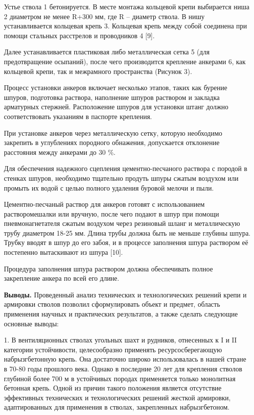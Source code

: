 \begin{multicols}{2}
Устье ствола 1 бетонируется. В месте монтажа кольцевой крепи выбирается
ниша 2 диаметром не менее R+300 мм, где R -- диаметр ствола. В нишу
устанавливается кольцевая крепь 3. Кольцевая крепь между собой соединена
при помощи стальных расстрелов и проводников 4 {[}9{]}.

Далее устанавливается пластиковая либо металлическая сетка 5 (для
предотвращение осыпаний), после чего производится крепление анкерами 6,
как кольцевой крепи, так и межрамного пространства (Рисунок 3).

Процесс установки анкеров включает несколько этапов, таких как бурение
шпуров, подготовка раствора, наполнение шпуров раствором и закладка
арматурных стержней. Расположение шпуров для установки штанг должно
соответствовать указаниям в паспорте крепления.

При установке анкеров через металлическую сетку, которую необходимо
закрепить в углублениях породного обнажения, допускается отклонение
расстояния между анкерами до 30 \%.

Для обеспечения надежного сцепления цементно-песчаного раствора с
породой в стенках шпуров, необходимо тщательно продуть шпуры сжатым
воздухом или промыть их водой с целью полного удаления буровой мелочи и
пыли.

Цементно-песчаный раствор для анкеров готовят с использованием
растворомешалки или вручную, после чего подают в шпур при помощи
пневмонагнетателя сжатым воздухом через резиновый шланг и металлическую
трубу диаметром 18-25 мм. Длина трубы должна быть не меньше глубины
шпура. Трубку вводят в шпур до его забоя, и в процессе заполнения шпура
раствором её постепенно вытаскивают из шпура {[}10{]}.

Процедура заполнения шпура раствором должна обеспечивать полное
закрепление анкера по всей его длине.

{\bfseries Выводы.} Проведенный анализ технических и технологических
решений крепи и армировки стволов позволил сформулировать объект и
предмет, область применения научных и практических результатов, а также
сделать следующие основные выводы:

1. В вентиляционных стволах угольных шахт и рудников, отнесенных к I и
II категории устойчивости, целесообразно применять ресурсосберегающую
набрызгбетонную крепь. Она достаточно широко использовалась в нашей
стране в 70-80 годы прошлого века. Однако в последние 20 лет для
крепления стволов глубиной более 700 м в устойчивых породах применяется
только монолитная бетонная крепь. Одной из причин такого положения
является отсутствие эффективных технических и технологических решений
жесткой армировки, адаптированных для применения в стволах, закрепленных
набрызгбетоном.


\end{multicols}
